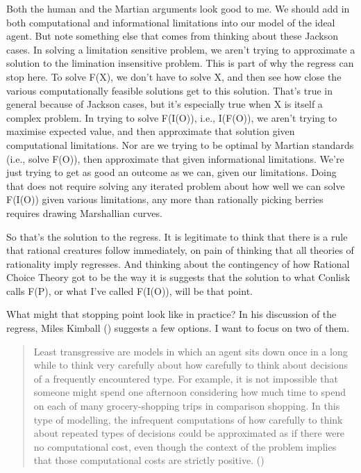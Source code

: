 \documentclass[
  10pt,
  letterpaper,
  twoside]{scrbook}
\begin{document}
Both the human and the Martian arguments look good to me. We should add
in both computational and informational limitations into our model of
the ideal agent. But note something else that comes from thinking about
these Jackson cases. In solving a limitation sensitive problem, we
aren't trying to approximate a solution to the limination insensitive
problem. This is part of why the regress can stop here. To solve F(X),
we don't have to solve X, and then see how close the various
computationally feasible solutions get to this solution. That's true in
general because of Jackson cases, but it's especially true when X is
itself a complex problem. In trying to solve F(I(O)), i.e., I(F(O)), we
aren't trying to maximise expected value, and then approximate that
solution given computational limitations. Nor are we trying to be
optimal by Martian standards (i.e., solve F(O)), then approximate that
given informational limitations. We're just trying to get as good an
outcome as we can, given our limitations. Doing that does not require
solving any iterated problem about how well we can solve F(I(O)) given
various limitations, any more than rationally picking berries requires
drawing Marshallian curves.

So that's the solution to the regress. It is legitimate to think that
there is a rule that rational creatures follow immediately, on pain of
thinking that all theories of rationality imply regresses. And thinking
about the contingency of how Rational Choice Theory got to be the way it
is suggests that the solution to what Conlisk calls F(P), or what I've
called F(I(O)), will be that point.

What might that stopping point look like in practice? In his discussion
of the regress, Miles Kimball ()
suggests a few options. I want to focus on two of them.

\begin{quote}
Least transgressive are models in which an agent sits down once in a
long while to think very carefully about how carefully to think about
decisions of a frequently encountered type. For example, it is not
impossible that someone might spend one afternoon considering how much
time to spend on each of many grocery-shopping trips in comparison
shopping. In this type of modelling, the infrequent computations of how
carefully to think about repeated types of decisions could be
approximated as if there were no computational cost, even though the
context of the problem implies that those computational costs are
strictly positive. ()
\end{quote}
\end{document}
